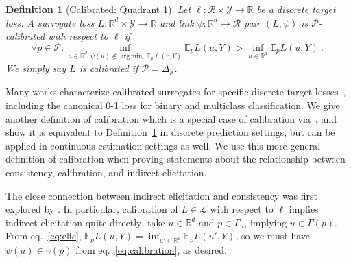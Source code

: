 \documentclass[11pt]{article} %
\newcommand{\Comments}{1}
\newcommand{\mytodo}[2]{\ifnum\Comments=1%
	\todo[linecolor=#1!80!black,backgroundcolor=#1,bordercolor=#1!80!black]{#2}\fi}
\newcommand{\jessiet}[1]{\mytodo{purple!20!white}{JF: #1}}
\newcommand{\reals}{\mathbb{R}}
\newcommand{\simplex}{\Delta_\Y}
\newcommand{\E}{\mathbb{E}}
\renewcommand{\L}{\mathcal{L}}
\newcommand{\R}{\mathcal{R}}
\renewcommand{\P}{\mathcal{P}}
\newcommand{\Y}{\mathcal{Y}}
\newcommand{\exploss}[3]{\E_{#3} #1(#2,Y)}
\newtheorem{definition}{Definition}
\DeclareMathOperator*{\argmin}{arg\,min}
\begin{document}
\begin{definition}[Calibrated: Quadrant 1]\label{def:calibrated-finite}
	Let $\ell : \R \times \Y \to \reals$ be a discrete target loss.
	A surrogate loss $L : \reals^d \times \Y \to \reals$  and link $\psi:\reals^d \to \R$ pair $(L, \psi)$ is \emph{$\P$-calibrated with respect to} $\ell$ if 
	\begin{equation}\label{eq:calibration}
	\forall p \in \P: \inf_{u \in \reals^d : \psi(u) \not \in \argmin_r \E_p\ell(r,Y)} \exploss{L}{u}{p} > \inf_{u \in \reals^d} \exploss{L}{u}{p}~.~
	\end{equation}
	We simply say $L$ is calibrated if $\P = \simplex$.
\end{definition}

Many works characterize calibrated surrogates for specific discrete target losses~\citep{zhang2004statistical,lin2004note,bartlett2006convexity,tewari2007consistency}, including the canonical 0-1 loss for binary and multiclass classification.
We give another definition of calibration which is a special case of calibration via~\citet{steinwart2008support}, and show it is equivalent to Definition~\ref{def:calibrated-finite} in discrete prediction settings, but can be applied in continuous estimation settings as well.
%
We use this more general definition of calibration when proving statements about the relationship between consistency, calibration, and indirect elicitation.

The close connection between indirect elicitation and consistency was first explored by \citet{agarwal2015consistent}.
In particular, calibration of $L \in \L$ with respect to $\ell$ implies indirect elicitation quite directly: take $u\in\reals^d$ and $p\in\Gamma_u$, implying $u\in\Gamma(p)$.
From eq.~\eqref{eq:elic}, $\exploss{L}{u}{p} = \inf_{u'\in\reals^d} \exploss{L}{u'}{p}$, so we must have $\psi(u) \in \gamma(p)$ from eq.~\eqref{eq:calibration}, as desired.
\end{document}
